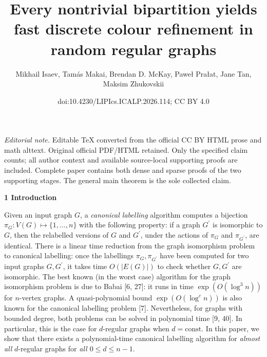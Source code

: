 \documentclass[10pt,a4paper]{article}
\title{Every nontrivial bipartition yields fast discrete colour refinement in random regular graphs}
\author{Mikhail Isaev, Tamás Makai, Brendan D. McKay, Paweł Prałat, Jane Tan, Maksim Zhukovskii}
\date{doi:10.4230/LIPIcs.ICALP.2026.114; CC BY 4.0}
\begin{document}
\maketitle
\noindent\textit{Editorial note.} Editable TeX converted from the official CC BY HTML prose and math alttext. Original official PDF/HTML retained. Only the specified claim counts; all author context and available source-local supporting proofs are included. Complete paper contains both dense and sparse proofs of the two supporting stages. The general main theorem is the sole collected claim.\par\medskip


\par\medskip\noindent\textbf{
1 Introduction}\par




Given an input graph $G$, a \emph{canonical labelling} algorithm computes a bijection $\pi_{G}:V(G)\mapsto\{1,\ldots,n\}$ with the following property: if a graph $G^{\prime}$ is isomorphic to $G$, then the relabelled versions of $G$ and $G^{\prime}$, under the actions of $\pi_{G}$ and $\pi_{G^{\prime}}$, are identical. There is a linear time reduction from the graph isomorphism problem to canonical labelling: once the labellings $\pi_{G},\pi_{G^{\prime}}$ have been computed for two input graphs $G,G^{\prime}$, it takes time $O(|E(G)|)$ to check whether $G,G^{\prime}$ are isomorphic. The best known (in the worst case) algorithm for the graph isomorphism problem is due to Babai [6, 27]: it runs in time $\exp(O(\log^{3}n))$ for $n$-vertex graphs. A quasi-polynomial bound $\exp(O(\log^{c}n))$ is also known for the canonical labelling problem [7]. Nevertheless, for graphs with bounded degree, both problems can be solved in polynomial time [9, 40]. In particular, this is the case for $d$-regular graphs when $d=\mathrm{const}.$ In this paper, we show that there exists a polynomial-time canonical labelling algorithm for \emph{almost all} $d$-regular graphs for \emph{all $0\leq d\leq n-1$}.\par
\end{document}
